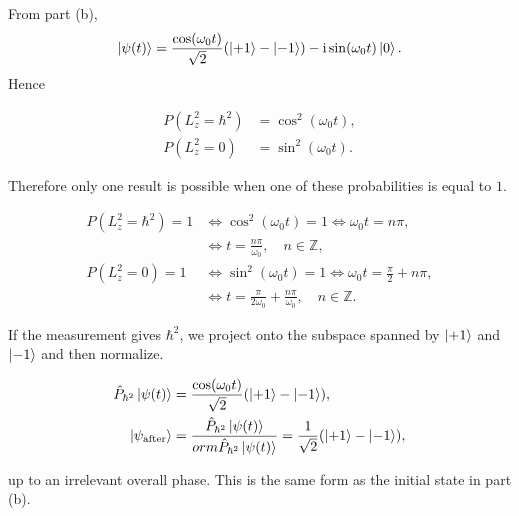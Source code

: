 \documentclass[11pt,a4paper]{scrartcl}
\newcommand{\ii}{\mathrm{i}}
\newcommand{\op}[1]{\hat{#1}}
\begin{document}
\begin{enumerate}[label=(\alph*)]
\begin{calculationbox}
            From part (b),
            \[
                \ket{\psi(t)}
                =\frac{\cos(\omega_0t)}{\sqrt{2}}(\ket{+1}-\ket{-1})
                -\ii\sin(\omega_0t)\ket{0}.
            \]
            Hence
            \begin{calculationbox}
                \begin{align*}
                    P(L_z^2=\hbar^2) &= \cos^2(\omega_0t),\\
                    P(L_z^2=0) &= \sin^2(\omega_0t).
                \end{align*}
            \end{calculationbox}

            Therefore only one result is possible when one of these probabilities is equal to $1$.
            \begin{calculationbox}
                \begin{align*}
                    P(L_z^2=\hbar^2)=1
                    &\Longleftrightarrow \cos^2(\omega_0t)=1
                    \Longleftrightarrow \omega_0t=n\pi, \\
                    &\Longleftrightarrow t=\frac{n\pi}{\omega_0},\quad n\in\mathbb{Z},\\[0.4em]
                    P(L_z^2=0)=1
                    &\Longleftrightarrow \sin^2(\omega_0t)=1
                    \Longleftrightarrow \omega_0t=\frac{\pi}{2}+n\pi, \\
                    &\Longleftrightarrow t=\frac{\pi}{2\omega_0}+\frac{n\pi}{\omega_0},\quad n\in\mathbb{Z}.
                \end{align*}
            \end{calculationbox}

            If the measurement gives $\hbar^2$, we project onto the subspace spanned by $\ket{+1}$ and $\ket{-1}$ and then normalize.
            \begin{calculationbox}
                \begin{align*}
                    \op{P}_{\hbar^2}\ket{\psi(t)}
                    &=\frac{\cos(\omega_0t)}{\sqrt{2}}(\ket{+1}-\ket{-1}),\\
                    \ket{\psi_{\text{after}}}
                    &=\frac{\op{P}_{\hbar^2}\ket{\psi(t)}}{
orm{\op{P}_{\hbar^2}\ket{\psi(t)}}}
                    =\frac{1}{\sqrt{2}}(\ket{+1}-\ket{-1}),
                \end{align*}
            \end{calculationbox}
            up to an irrelevant overall phase. This is the same form as the initial state in part (b).
        \end{calculationbox}


\end{enumerate}
\end{document}
